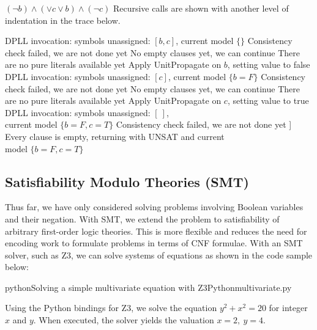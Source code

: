 \documentclass[a4paper,openany,12pt]{book}
\begin{document}
\begin{example}{$(\neg b) \land (\lor c \lor b) \land (\neg c)$}
    \newcommand{\crossMark}{\faIcon[light]{times}}
    Recursive calls are shown with another level of indentation in the trace below.
    \begin{outline}
        \1[\cogs] DPLL invocation: symbols unassigned: $[b, c]$, current model $\{\}$
        \1[\arrow] Consistency check failed, we are not done yet
        \1[\arrow] No empty clauses yet, we can continue
        \1[\arrow] There are no pure literals available yet
        \1[\arrow] Apply UnitPropagate on $b$, setting value to false
        \2[\cogs] DPLL invocation: symbols unassigned: $[c]$, current model $\{b=F\}$
        \2[\arrow] Consistency check failed, we are not done yet
        \2[\arrow] No empty clauses yet, we can continue
        \2[\arrow] There are no pure literals available yet
        \2[\arrow] Apply UnitPropagate on $c$, setting value to true
        \3[\cogs] DPLL invocation: symbols unassigned: $[~]$,\\ current model $\{b=F, c=T\}$
        \3[\arrow] Consistency check failed, we are not done yet
        \3[\crossMark] Every clause is empty, returning with \textsc{UNSAT} and current\\model $\{b=F, c=T\}$
    \end{outline}
\end{example}

\subsection{Satisfiability Modulo Theories (SMT)}

Thus far, we have only considered solving problems involving Boolean variables and their negation.
With SMT, we extend the problem to satisfiability of arbitrary first-order logic theories.
This is more flexible and reduces the need for encoding work to formulate problems in terms of CNF formulae.
With an SMT solver, such as Z3, we can solve systems of equations as shown in the code sample below:

\begin{mycodefile}{python}{\label{code:z3:1}Solving a simple multivariate equation with Z3}{Python}{multivariate.py}

    Using the Python bindings for Z3, we solve the equation $y^2 + x^2 = 20$ for integer $x$ and $y$.
    When executed, the solver yields the valuation $x = 2,~y = 4$.

    \vspace{0.5em}
\end{mycodefile}
\end{document}
